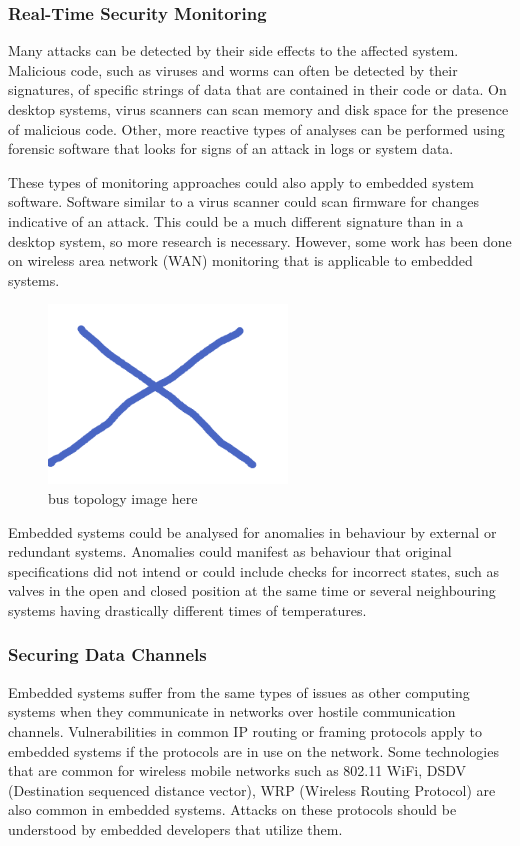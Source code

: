 \documentclass[final,conference,10pt]{IEEEtran}
\begin{document}
\subsubsection{Real-Time Security Monitoring}
Many attacks can be detected by their side effects to the affected system.  Malicious code, such as viruses and worms can often be detected by their signatures, of specific strings of data that are contained in their code or data.  On desktop systems, virus scanners can scan memory and disk space for the presence of malicious code.  Other, more reactive types of analyses can be performed using forensic software that looks for signs of an attack in logs or system data.  

These types of monitoring approaches could also apply to embedded system software.  Software similar to a virus scanner could scan firmware for changes indicative of an attack.  This could be a much different signature than in a desktop system, so more research is necessary.  However, some work has been done on wireless area network (WAN) monitoring that is applicable to embedded systems. \cite{}

\begin{figure}[!t]
\centering
\includegraphics[width=2.5in]{topology}
\caption{bus topology image here}
\label{fig:monitor}
\end{figure}

Embedded systems could be analysed for anomalies in behaviour by external or redundant systems.  Anomalies could manifest as behaviour that original specifications did not intend or could include checks for incorrect states, such as valves in the open and closed position at the same time or several neighbouring systems having drastically different times of temperatures. \cite{Master Failure Detection Protocol in Internal Synchronization Environment} 

\subsubsection{Securing Data Channels}
Embedded systems suffer from the same types of issues as other computing systems when they communicate in networks over hostile communication channels.  Vulnerabilities in common IP routing or framing protocols apply to embedded systems if the protocols are in use on the network.  Some technologies that are common for wireless mobile networks such as 802.11 WiFi, DSDV (Destination sequenced distance vector), WRP (Wireless Routing Protocol) are also common in embedded systems. Attacks on these protocols should be understood by embedded developers that utilize them. 
\end{document}
